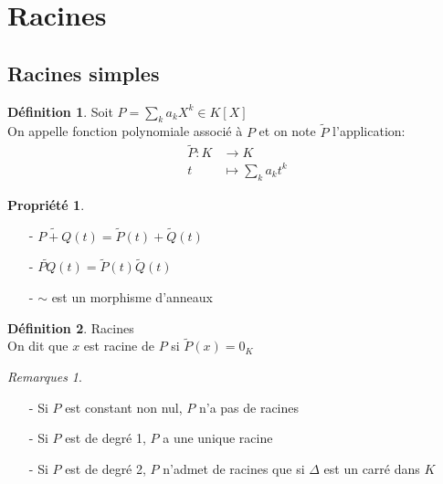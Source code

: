 \documentclass[fleqn]{article}
\theoremstyle{definition} \newtheorem*{defi}{D\'efinition}
\theoremstyle{definition} \newtheorem*{theo}{Th\'eor\`eme}
\theoremstyle{definition} \newtheorem*{coro}{Corollaire}
\theoremstyle{definition} \newtheorem*{nota}{Notation}
\theoremstyle{remark} \newtheorem*{rqs}{Remarques}
\theoremstyle{definition} \newtheorem*{prop}{Propri\'et\'e}
\begin{document}
\section{Racines}
\subsection{Racines simples}
\begin{defi} Soit $P = \sum_k a_k X^k \in K[X]$ \\
	On appelle fonction polynomiale associ\'e \`a $P$ et on note $\tilde{P}$ l'application: \begin{align*} \tilde{P}: K &\rightarrow K\\
	t &\mapsto \sum_k a_kt^k \end{align*}
\end{defi}

\begin{prop} $ $
	\begin{itemize}
		\item [-] $\tilde{P+Q}(t) = \tilde{P}(t) + \tilde{Q}(t)$
		\item [-] $\tilde{PQ}(t) = \tilde{P}(t) \tilde{Q}(t)$
		\item [-] $\sim$ est un morphisme d'anneaux
	\end{itemize}
\end{prop}

\begin{defi} Racines \\
	On dit que $x$ est racine de $P$ si $\tilde{P}(x) = 0_K$
	\begin{rqs} $ $
		\begin{itemize}
			\item [-] Si $P$ est constant non nul, $P$ n'a pas de racines
			\item [-] Si $P$ est de degr\'e 1, $P$ a une unique racine
			\item [-] Si $P$ est de degr\'e 2, $P$ n'admet de racines que si $\Delta$ est un carr\'e dans $K$
		\end{itemize}
	\end{rqs}
\end{defi}
\end{document}
